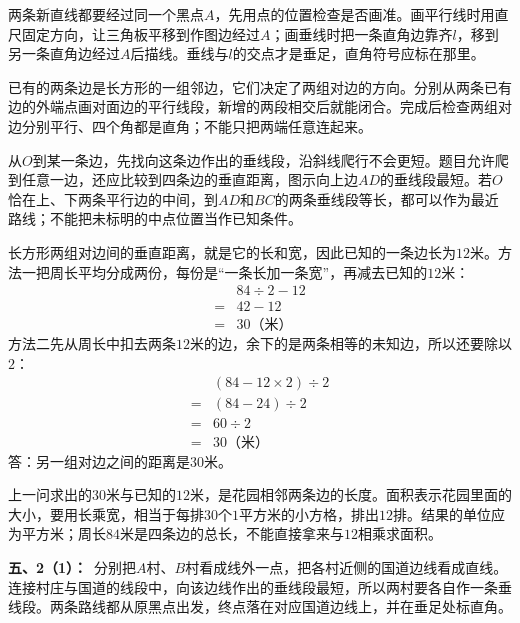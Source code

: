 \documentclass[multi=snippet,border=0pt]{standalone}
\newenvironment{snippet}[3]{\begin{minipage}{#1bp}\color{answerred}\fontsize{#2}{#3}\selectfont\raggedright}{\end{minipage}}
\begin{document}
\begin{snippet}{505}{11.5}{14}两条新直线都要经过同一个黑点\(A\)，先用点的位置检查是否画准。画平行线时用直尺固定方向，让三角板平移到作图边经过\(A\)；画垂线时把一条直角边靠齐\(l\)，移到另一条直角边经过\(A\)后描线。垂线与\(l\)的交点才是垂足，直角符号应标在那里。\end{snippet}
\begin{snippet}{505}{11.5}{14}已有的两条边是长方形的一组邻边，它们决定了两组对边的方向。分别从两条已有边的外端点画对面边的平行线段，新增的两段相交后就能闭合。完成后检查两组对边分别平行、四个角都是直角；不能只把两端任意连起来。\end{snippet}
\begin{snippet}{505}{11.5}{14}从\(O\)到某一条边，先找向这条边作出的垂线段，沿斜线爬行不会更短。题目允许爬到任意一边，还应比较到四条边的垂直距离，图示向上边\(AD\)的垂线段最短。若\(O\)恰在上、下两条平行边的中间，到\(AD\)和\(BC\)的两条垂线段等长，都可以作为最近路线；不能把未标明的中点位置当作已知条件。\end{snippet}
\begin{snippet}{505}{11.5}{14}长方形两组对边间的垂直距离，就是它的长和宽，因此已知的一条边长为\(12\)米。方法一把周长平均分成两份，每份是“一条长加一条宽”，再减去已知的\(12\)米：\[\begin{aligned}&84\div2-12\\={}&42-12\\={}&30\text{（米）}\end{aligned}\]方法二先从周长中扣去两条\(12\)米的边，余下的是两条相等的未知边，所以还要除以\(2\)：\[\begin{aligned}&(84-12\times2)\div2\\={}&(84-24)\div2\\={}&60\div2\\={}&30\text{（米）}\end{aligned}\]答：另一组对边之间的距离是30米。\end{snippet}
\begin{snippet}{505}{11.5}{14}上一问求出的\(30\)米与已知的\(12\)米，是花园相邻两条边的长度。面积表示花园里面的大小，要用长乘宽，相当于每排\(30\)个\(1\)平方米的小方格，排出\(12\)排。结果的单位应为平方米；周长\(84\)米是四条边的总长，不能直接拿来与\(12\)相乘求面积。\end{snippet}
\begin{snippet}{505}{11.5}{14}\textbf{五、2（1）：}\ 分别把\(A\)村、\(B\)村看成线外一点，把各村近侧的国道边线看成直线。连接村庄与国道的线段中，向该边线作出的垂线段最短，所以两村要各自作一条垂线段。两条路线都从原黑点出发，终点落在对应国道边线上，并在垂足处标直角。\end{snippet}
\end{document}
